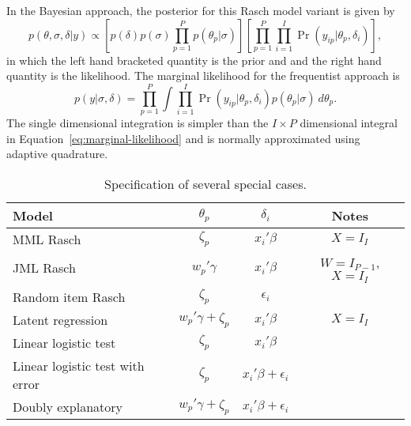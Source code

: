 \documentclass[12pt, letterpaper]{article}
\begin{document}
In the Bayesian approach, the posterior for this Rasch model variant is given by
\begin{equation}
	p(\theta, \sigma, \delta | y) \propto
	\left [ 
		p(\delta) 	p(\sigma)
		\prod_{p=1}^P p(\theta_p | \sigma) 
	\right ]
	\left [ 
		\prod_{p=1}^P \prod_{i=1}^I 
		\Pr ( y_{ip} | \theta_p, \delta_i) 
	\right ]
,\end{equation}
in which the left hand bracketed quantity is the prior and and the right hand quantity is the likelihood. The marginal likelihood for the frequentist approach is
\begin{equation}
	p(y | \sigma, \delta) =
	\prod_{p=1}^P
	\int
		\prod_{i=1}^I 
		\Pr(y_{ip} | \theta_p, \delta_i)
		p(\theta_p | \sigma)
	~d \theta_p
.\end{equation}
The single dimensional integration is simpler than the $I \times P$ dimensional integral in Equation~\ref{eq:marginal-likelihood} and is normally approximated using adaptive quadrature.

\begin{table}
	\centering
	\begin{tabular}{lccc}
		\hline
		Model	& $\theta_p$ & $\delta_i$ & Notes \\ \hline
		MML Rasch
			& $\zeta_p$ & $x_i'\beta$ & $X = I_I$ \\ 
		JML Rasch
			& $w_p' \gamma$ & $x_i'\beta$ & $W = I_{P-1}$, $X = I_I$ \\ 
		Random item Rasch
			& $\zeta_p$ & $\epsilon_i$ &  \\ 
		Latent regression
			& $w_p' \gamma + \zeta_p$ & $x_i'\beta$ & $X = I_I$ \\ 
		Linear logistic test
			& $\zeta_p$ & $x_i'\beta$ &  \\ 
		Linear logistic test with error
			& $\zeta_p$ & $x_i'\beta + \epsilon_i$ &  \\ 
		Doubly explanatory
			& $w_p' \gamma + \zeta_p$ &  $x_i'\beta + \epsilon_i$ & \\
		\hline
	\end{tabular}
	\caption{Specification of several special cases.}
	\label{tab:special-cases}
\end{table}
\end{document}

